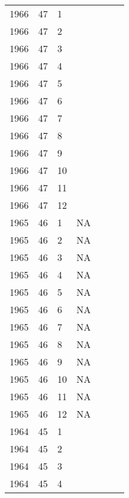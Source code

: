 \begin{longtable}{ |l|l|l|l|p{2.7cm}|l|p{2cm}| }
 1966 & 47 &     1 &         &                &  & \\
 1966 & 47 &     2 &         &                &  & \\
 1966 & 47 &     3 &         &                &  & \\
 1966 & 47 &     4 &         &                &  & \\
 1966 & 47 &     5 &         &                &  & \\
 1966 & 47 &     6 &         &                &  & \\
 1966 & 47 &     7 &         &                &  & \\
 1966 & 47 &     8 &         &                &  & \\
 1966 & 47 &     9 &         &                &  & \\
 1966 & 47 &    10 &         &                &  & \\
 1966 & 47 &    11 &         &                &  & \\
 1966 & 47 &    12 &         &                &  & \\
 1965 & 46 &     1 &      NA &                &  & \\
 1965 & 46 &     2 &      NA &                &  & \\
 1965 & 46 &     3 &      NA &                &  & \\
 1965 & 46 &     4 &      NA &                &  & \\
 1965 & 46 &     5 &      NA &                &  & \\
 1965 & 46 &     6 &      NA &                &  & \\
 1965 & 46 &     7 &      NA &                &  & \\
 1965 & 46 &     8 &      NA &                &  & \\
 1965 & 46 &     9 &      NA &                &  & \\
 1965 & 46 &    10 &      NA &                &  & \\
 1965 & 46 &    11 &      NA &                &  & \\
 1965 & 46 &    12 &      NA &                &  & \\
 1964 & 45 &     1 &         &                &  & \\
 1964 & 45 &     2 &         &                &  & \\
 1964 & 45 &     3 &         &                &  & \\
 1964 & 45 &     4 &         &                &  & \\

\end{longtable}
